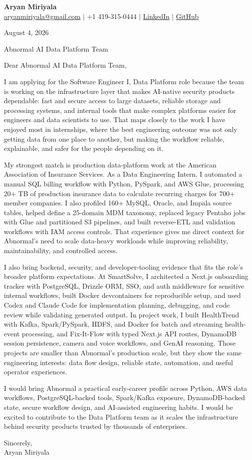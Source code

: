 \documentclass[letterpaper,11pt]{article}
\begin{document}
{\Large\textbf{Aryan Miriyala}}\\
\href{mailto:aryanmiriyala@gmail.com}{aryanmiriyala@gmail.com} $|$ +1 419-315-0444 $|$
\href{https://www.linkedin.com/in/aryan-miriyala-7788a21b6/}{LinkedIn} $|$
\href{https://github.com/aryanmiriyala}{GitHub}

August 4, 2026

Abnormal AI Data Platform Team

Dear Abnormal AI Data Platform Team,

I am applying for the Software Engineer I, Data Platform role because the team is working on the infrastructure layer that makes AI-native security products dependable: fast and secure access to large datasets, reliable storage and processing systems, and internal tools that make complex platforms easier for engineers and data scientists to use. That maps closely to the work I have enjoyed most in internships, where the best engineering outcome was not only getting data from one place to another, but making the workflow reliable, explainable, and safer for the people depending on it.

My strongest match is production data-platform work at the American Association of Insurance Services. As a Data Engineering Intern, I automated a manual SQL billing workflow with Python, PySpark, and AWS Glue, processing 20+ TB of production insurance data to calculate recurring charges for 700+ member companies. I also profiled 160+ MySQL, Oracle, and Impala source tables, helped define a 25-domain MDM taxonomy, replaced legacy Pentaho jobs with Glue and partitioned S3 pipelines, and built reverse-ETL and validation workflows with IAM access controls. That experience gives me direct context for Abnormal's need to scale data-heavy workloads while improving reliability, maintainability, and controlled access.

I also bring backend, security, and developer-tooling evidence that fits the role's broader platform expectations. At SmartSolve, I architected a Next.js onboarding tracker with PostgreSQL, Drizzle ORM, SSO, and auth middleware for sensitive internal workflows, built Docker devcontainers for reproducible setup, and used Codex and Claude Code for implementation planning, debugging, and code review while validating generated output. In project work, I built HealthTrend with Kafka, Spark/PySpark, HDFS, and Docker for batch and streaming health-event processing, and Fix-It-Flow with typed Next.js API routes, DynamoDB session persistence, camera and voice workflows, and GenAI reasoning. Those projects are smaller than Abnormal's production scale, but they show the same engineering interests: data flow design, reliable state, automation, and useful operator experiences.

I would bring Abnormal a practical early-career profile across Python, AWS data workflows, PostgreSQL-backed tools, Spark/Kafka exposure, DynamoDB-backed state, secure workflow design, and AI-assisted engineering habits. I would be excited to contribute to the Data Platform team as it scales the infrastructure behind security products trusted by thousands of enterprises.

Sincerely,\\
Aryan Miriyala
\end{document}
